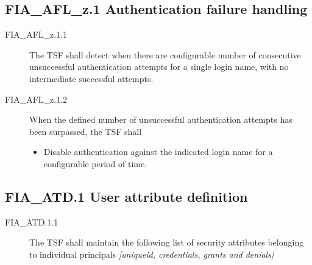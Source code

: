 \documentclass[10pt,a4paper,english]{book}
\begin{document}
\subsection{FIA{\_}AFL{\_}z.1 Authentication failure handling}
\begin{description}
\item[FIA{\_}AFL{\_}z.1.1]

The TSF shall detect when there are configurable number of consecutive
unsuccessful authentication attempts for a single login name,
with no intermediate successful attempts.

\item[FIA{\_}AFL{\_}z.1.2 ]

When the defined number of unsuccessful authentication attempts
has been surpassed, the TSF shall
\begin{itemize}
\item {} 
Disable authentication against the indicated login name for a
configurable period of time.

\end{itemize}

\end{description}



\hypertarget{fia-atd-1-user-attribute-definition}{}
\subsection{FIA{\_}ATD.1 User attribute definition}
\begin{description}
\item[FIA{\_}ATD.1.1 ]

The TSF shall maintain the following list of security attributes
belonging to individual principals \emph{{[}uniqueid, credentials, grants
and denials]}

\end{description}


\end{document}
